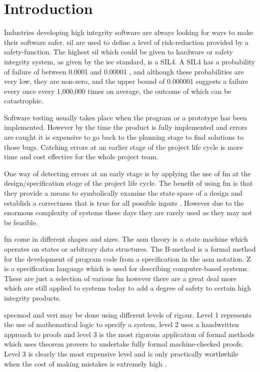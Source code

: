 
\chapter{Introduction}
\label{ch:introduction}

Industries developing high integrity software are always looking for ways to
make their software safer. \gls{sil} are used to define a level of
risk-reduction provided by a safety-function. The highest \gls{sil}
\cite{siliso} which could be given to hardware or safety integrity system, as
given by the \gls{iec} \cite{iec} standard, is a SIL4. A SIL4 has a probability
of failure of between 0.0001 and 0.00001 \cite{IEC61508}, and although these
probabilities are very low, they are non-zero, and the upper bound of 0.000001
suggests a failure every once every 1,000,000 times on average, the outcome of
which can be catastrophic.

Software testing usually takes place when the program or a prototype has been
implemented. However by the time the product is fully implemented and errors are
caught it is expensive to go back to the planning stage to find solutions to
those bugs. Catching errors at an earlier stage of the project life cycle is
more time and cost effective for the whole project team.

One way of detecting errors at an early stage is by applying the use of \gls{fm}
at the design/specification stage of the project life cycle. The benefit of
using \gls{fm} is that they provide a means to symbolically examine the state
space of a design and establish a correctness that is true for all possible
inputs \cite{wifrm}. However due to the enormous complexity of systems these
days they are rarely used as they may not be feasible. 

\Gls{fm} come in different shapes and sizes. The \gls{asm} theory
\cite{Borger:2003:ASM:829603} is a state machine which operates on states or
arbitrary data structures. The B-method \cite{bmeth} is a formal method for the
development of program code from a specification in the \gls{asm} notation. Z
\cite{spiveyreferencemanual} is a specification language which is used for
describing computer-based systems. These are just a selection of various
\gls{fm} however there are a great deal more which are still applied to systems
today to add a degree of safety to certain high integrity products.

\Gls{specmod} and \gls{veri} may be done using different levels of rigour. Level
1 represents the use of mathematical logic to specify a system, level 2 uses a
handwritten approach to proofs and level 3 is the most rigorous application of
formal methods which uses theorem provers to undertake fully formal
machine-checked proofs. Level 3 is clearly the most expensive level and is only
practically worthwhile when the cost of making mistakes is extremely high
\cite{encyclopedia}.

